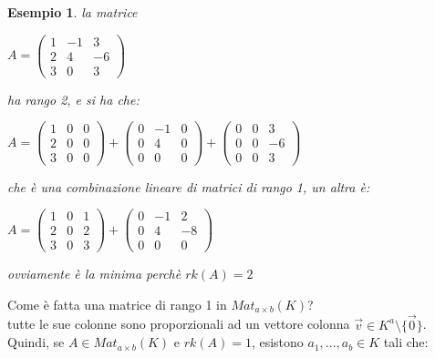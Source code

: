 \documentclass[a4paper,12pt]{article}
\theoremstyle{def}
\theoremstyle{prop}
\theoremstyle{esempio}
\newtheorem*{example}{Esempio}
\theoremstyle{dimostrazione}
\theoremstyle{teo}
\theoremstyle{osservazione}
\begin{document}
\begin{example}
	la matrice
	\begin{center}
		\(A = \begin{pmatrix}
			1 & -1 & 3  \\
			2 & 4  & -6 \\
			3 & 0  & 3
		\end{pmatrix}\)
	\end{center}
	ha rango 2, e si ha che:
	\begin{center}
		\(A = \begin{pmatrix}
			1 & 0 & 0 \\
			2 & 0 & 0 \\
			3 & 0 & 0
		\end{pmatrix} + \begin{pmatrix}
			0 & -1 & 0 \\
			0 & 4  & 0 \\
			0 & 0  & 0
		\end{pmatrix} + \begin{pmatrix}
			0 & 0 & 3  \\
			0 & 0 & -6 \\
			0 & 0 & 3
		\end{pmatrix}\)
	\end{center}
	che è una combinazione lineare di matrici di rango 1, un altra è:
	\begin{center}
		\(A = \begin{pmatrix}
			1 & 0 & 1 \\
			2 & 0 & 2 \\
			3 & 0 & 3
		\end{pmatrix} + \begin{pmatrix}
			0 & -1 & 2  \\
			0 & 4  & -8 \\
			0 & 0  & 0
		\end{pmatrix}\)
	\end{center}
	ovviamente è la minima perchè \(rk(A) = 2\)\\
\end{example}
Come è fatta una matrice di rango 1 in \(Mat_{a \times b}(K)\)?\\
tutte le sue colonne sono proporzionali ad un vettore colonna \(\overrightarrow{v} \in K^a \setminus \{\overrightarrow{0}\}\).\\
Quindi, se \(A \in Mat_{a \times b}(K)\) e \(rk(A) = 1\), esistono \(a_1, ..., a_b \in K\) tali che:
\end{document}
